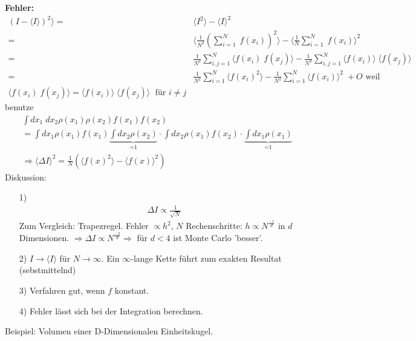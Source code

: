 \documentclass[12pt]{article}
\begin{document}
\textbf{Fehler:} 
\begin{align}
(I- \langle I \rangle)^2 \rangle =& \langle I^2 \rangle - \langle I \rangle ^2 \\
=& \langle \frac{1}{N^2} \left( \sum_{i=1}^N \; f(x_i) \right) ^2 \rangle - \langle \frac{1}{N} \sum_{i=1}^N \; f(x_i)\rangle^2 \\
=& \frac{1}{N^2} \sum_{i,j=1}^N \langle f(x_i) \; f(x_j) \rangle - \frac{1}{N^2} \sum_{i,j=1}^N \langle f(x_i) \rangle \; \langle f(x_j) \rangle \\
=& \frac{1}{N^2} \sum_{i=1}^N \langle f(x_i)^2 \rangle - \frac{1}{N^2} \sum_{i=1}^N \langle f(x_i) \rangle ^2 \; + O \mbox{ weil } \\
\langle f(x_i) \; f(x_j) \rangle = \langle f(x_i) \rangle \; \langle f(x_j) \rangle \; \mbox{ für } i \neq j
\end{align}
benutze
\begin{align}
\int dx_1 \; dx_2 \rho(x_1) \rho(x_2) f(x_1) f(x_2) \\
= \int dx_1 \rho(x_1)f(x_1)  \underbrace{\int dx_2 \rho(x_2)}_\text{=1}\cdot  \int dx_2 \rho(x_1)f(x_2) \cdot \underbrace{\int dx_1 \rho(x_1)}_\text{=1} \\
\Rightarrow \langle \Delta I \rangle ^2= \frac{1}{N} \left( \langle f(x)^2 \rangle - \langle f(x) \rangle^2 \right)
\end{align} 
Diskussion:
\begin{itemize}
\item[1)]
\begin{align}
\Delta I \propto \frac{1}{\sqrt{N}}
\end{align}
Zum Vergleich: Trapezregel. Fehler $\propto h^2 $, $N$ Rechenschritte: $h \propto N^{ \frac{-1}{d} }$ in $d$ Dimensionen. $\Rightarrow \Delta I \propto N^{\frac{-2}{d}} \Rightarrow$ für $d<4$ ist Monte Carlo 'besser'.

\item[2)] $I \to \langle I \rangle$ für $N \to \infty$. Ein $\infty$-lange Kette führt zum exakten Resultat (sebstmittelnd)

\item[3)] Verfahren gut, wenn $f$ konstant. %
\item[4)]Fehler lässt sich bei der Integration berechnen.
\end{itemize}
Beispiel: Volumen einer D-Dimensionalen Einheitskugel. 
\end{document}
